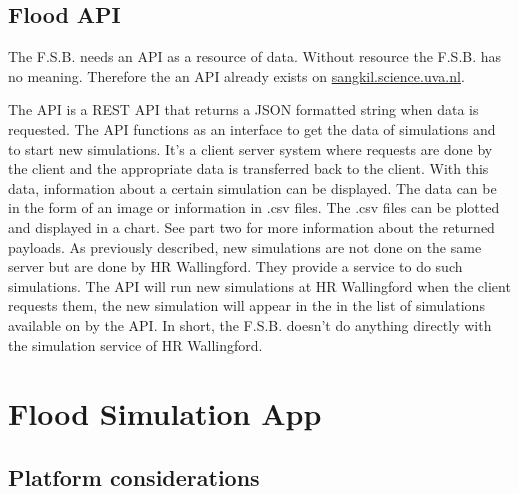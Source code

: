\subsection{Flood API}
The F.S.B. needs an API as a resource of data. Without resource the F.S.B. has no meaning. Therefore the an API already exists on \url{sangkil.science.uva.nl}.

The API is a REST API \cite{REST} that returns a JSON \cite{JSON} formatted string when data is requested. The API functions as an interface to get the data of simulations and to start new simulations. It's a client server system where requests are done by the client and the appropriate data is transferred back to the client. With this data, information about a certain simulation can be displayed. The data can be in the form of an image or information in .csv \cite{CSV} files. The .csv files can be plotted and displayed in a chart. See part two for more information about the returned payloads.
As previously described, new simulations are not done on the same server but are done by HR Wallingford. They provide a service to do such simulations. The API will run new simulations at HR Wallingford when the client requests them, the new simulation will appear in the in the list of simulations available on by the API. In short, the F.S.B. doesn't do anything directly with the simulation service of HR Wallingford.

\section{Flood Simulation App}
\subsection{Platform considerations}
